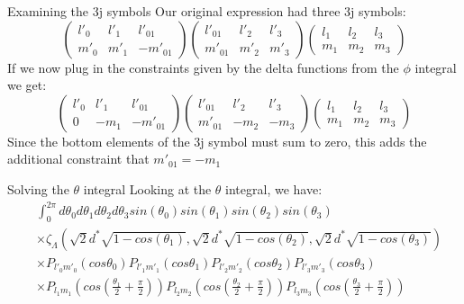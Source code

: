 \documentclass{beamer}
\begin{document}
    \begin{frame}{Examining the 3j symbols}
        Our original expression had three 3j symbols:
        \begin{equation*}
            \begin{pmatrix}
                l'_0 & l'_1 & l'_{01}\\
                m'_0 & m'_1 & -m'_{01}
            \end{pmatrix}
            \begin{pmatrix}
                l'_{01} & l'_2 & l'_{3}\\
                m'_{01} & m'_2 & m'_{3}
            \end{pmatrix}
            \begin{pmatrix}
                l_{1} & l_2 & l_{3}\\
                m_{1} & m_2 & m_{3}
            \end{pmatrix}
        \end{equation*}
        If we now plug in the constraints given by the delta functions from the $\phi$ integral we get:
        \begin{equation*}
            \begin{pmatrix}
                l'_0 & l'_1 & l'_{01}\\
                0 & -m_1 & -m'_{01}
            \end{pmatrix}
            \begin{pmatrix}
                l'_{01} & l'_2 & l'_{3}\\
                m'_{01} & -m_2 & -m_{3}
            \end{pmatrix}
            \begin{pmatrix}
                l_{1} & l_2 & l_{3}\\
                m_{1} & m_2 & m_{3}
            \end{pmatrix}
        \end{equation*}
        Since the bottom elements of the 3j symbol must sum to zero, this adds the additional constraint that $m'_{01}=-m_1$
    \end{frame}

    \begin{frame}{Solving the $\theta$ integral}
        Looking at the $\theta$ integral, we have:
        \begin{align*}
            &\int_0^{2\pi} d\theta_0 d\theta_1 d\theta_2 d\theta_3 sin(\theta_0) sin(\theta_1) sin(\theta_2) sin(\theta_3)\\
            &\times \zeta_{\Lambda}(\sqrt{2}d^*\sqrt{1-cos(\theta_1)}, \sqrt{2}d^*\sqrt{1-cos(\theta_2)}, \sqrt{2}d^*\sqrt{1-cos(\theta_3)})\\
            &\times P_{l'_0 m'_0}(cos \theta_0) P_{l'_1 m'_1}(cos \theta_1) P_{l'_2 m'_2}(cos \theta_2) P_{l'_3 m'_3}(cos \theta_3) \\
            &\times P_{l_1 m_1}(cos (\frac{\theta_1}{2} + \frac{\pi}{2})) P_{l_2 m_2}(cos (\frac{\theta_2}{2} + \frac{\pi}{2})) P_{l_3 m_3}(cos (\frac{\theta_3}{2} + \frac{\pi}{2}))
        \end{align*}
    \end{frame}
\end{document}

